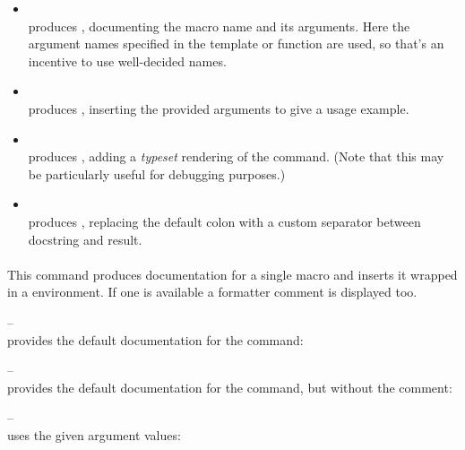 \documentclass[12pt]{scrartcl}
\begin{document}
\begin{itemize}
	\item \texttt{}\\
	produces , documenting the macro name and its
	arguments.  Here the argument names specified in the template or function are
	used, so that's an incentive to use well-decided names.
	\item \texttt{}\\
	produces , inserting
	the provided arguments to give a usage example.
	\item \texttt{}\\
	produces ,
	adding a \emph{typeset} rendering of the command. (Note that this may be
	particularly useful for debugging purposes.)
	\item \texttt{}\\
	produces , replacing the default colon with a custom separator between docstring and result.
\end{itemize}


\paragraph{\texttt{}}

This command produces documentation for a single macro and inserts it wrapped in a  environment.  If one is available a formatter comment is displayed too.

\medskip
\noindent \texttt{} --\\
provides the default documentation for the command:


\medskip
\noindent \texttt{} --\\
provides the default documentation for the command, but without the comment:


\medskip
\noindent \texttt{} --\\
uses the given argument values:
\end{document}
